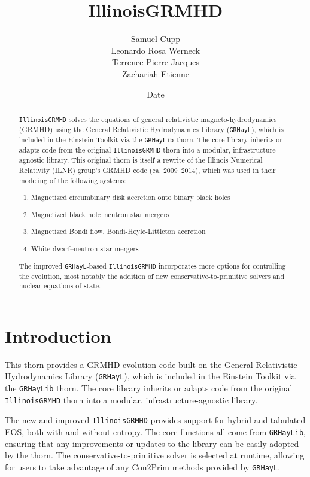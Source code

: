 \documentclass{article}
\newcommand{\grhayl}{\texttt{GRHayL}\xspace}
\newcommand{\glib}{\texttt{GRHayLib}\xspace}
\newcommand{\igm}{\texttt{IllinoisGRMHD}\xspace}
\begin{document}
\title{IllinoisGRMHD}
\author{Samuel Cupp \\ Leonardo Rosa Werneck \\ Terrence Pierre Jacques \\ Zachariah Etienne}
\date{$ $Date$ $}

\maketitle


\begin{abstract}
\igm solves the equations of general relativistic
magneto-hydrodynamics (GRMHD) using the General Relativistic
Hydrodynamics Library (\grhayl), which is included in the
Einstein Toolkit via the \glib thorn. The core library
inherits or adapts code from the original \igm thorn into a
modular, infrastructure-agnostic library. This original thorn
is itself a rewrite of the Illinois Numerical Relativity (ILNR)
group's GRMHD  code (ca. 2009--2014), which was used in their
modeling of the following systems:
\begin{enumerate}
\item Magnetized circumbinary disk accretion onto binary black holes
\item Magnetized black hole--neutron star mergers
\item Magnetized Bondi flow, Bondi-Hoyle-Littleton accretion
\item White dwarf--neutron star mergers
\end{enumerate}

The improved \grhayl-based \igm incorporates more options
for controlling the evolution, most notably the addition
of new conservative-to-primitive solvers and nuclear equations of
state.
\end{abstract}

\section{Introduction}

This thorn provides a GRMHD evolution code built on
the General Relativistic Hydrodynamics Library (\grhayl),
which is included in the Einstein Toolkit via the \glib
thorn. The core library inherits or adapts code from the
original \igm thorn into a modular, infrastructure-agnostic
library.

The new and improved \igm provides support for hybrid and
tabulated EOS, both with and without entropy. The core functions
all come from \glib, ensuring that any improvements or updates
to the library can be easily adopted by the thorn. The
conservative-to-primitive solver is selected at runtime, allowing
for users to take advantage of any Con2Prim methods provided by \grhayl.
\end{document}

